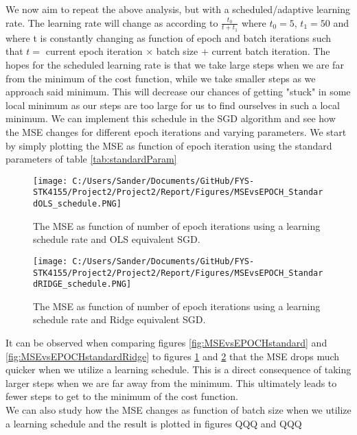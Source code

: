 \documentclass[12pt,a4paper]{article}
\begin{document}
\noindent We now aim to repeat the above analysis, but with a scheduled/adaptive learning rate. The learning rate will change as according to $\frac{t_0}{t+t_1}$ where $t_0 = 5$, $t_1 = 50$ and where t is constantly changing as function of epoch and batch iterations such that $t = $ current epoch iteration $\times$ batch size $+$ current batch iteration. The hopes for the scheduled learning rate is that we take large steps when we are far from the minimum of the cost function, while we take smaller steps as we approach said minimum. This will decrease our chances of getting "stuck" in some local minimum as our steps are too large for us to find ourselves in such a local minimum. We can implement this schedule in the SGD algorithm and see how the MSE changes for different epoch iterations and varying parameters. We start by simply plotting the MSE as function of epoch iteration using the standard parameters of table \ref{tab:standardParam}

\begin{figure}[H]
\centering
\texttt{[image: C:/Users/Sander/Documents/GitHub/FYS-STK4155/Project2/Project2/Report/Figures/MSEvsEPOCH\_StandardOLS\_schedule.PNG]}
\caption{\label{fig:MSEvsEPOCHstandard_sch} The MSE as function of number of epoch iterations using a learning schedule rate and OLS equivalent SGD.}
\end{figure}

\begin{figure}[H]
\centering
\texttt{[image: C:/Users/Sander/Documents/GitHub/FYS-STK4155/Project2/Project2/Report/Figures/MSEvsEPOCH\_StandardRIDGE\_schedule.PNG]}
\caption{\label{fig:MSEvsEPOCHstandardRidge_sch} The MSE as function of number of epoch iterations using a learning schedule rate and Ridge equivalent SGD.}
\end{figure}

\noindent It can be observed when comparing figures \ref{fig:MSEvsEPOCHstandard} and \ref{fig:MSEvsEPOCHstandardRidge} to figures \ref{fig:MSEvsEPOCHstandard_sch} and \ref{fig:MSEvsEPOCHstandardRidge_sch} that the MSE drops much quicker when we utilize a learning schedule. This is a direct consequence of taking larger steps when we are far away from the minimum. This ultimately leads to fewer steps to get to the minimum of the cost function. 
\\
We can also study how the MSE changes as function of batch size when we utilize a learning schedule and the result is plotted in figures QQQ and QQQ
\end{document}
